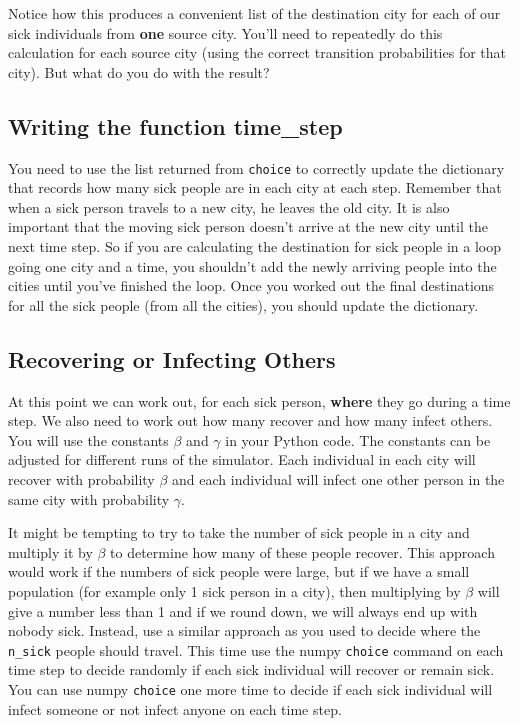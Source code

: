 \documentclass{assignment}
\begin{document}
Notice how this produces a convenient list of the destination city for each of our sick individuals from {\bf one} source city. You'll need to 
repeatedly do this calculation for each source city (using the correct transition probabilities for that city). But what do you do with the result?

\subsection*{Writing the function time\_step}

You need to use the list returned from \verb|choice| to correctly update the dictionary that records how many sick people are in each city at each step. Remember that when a sick person travels to a new city, he leaves the old city. It is also important that the moving sick person doesn't arrive at the new city until the next
time step. So if you are calculating the destination for sick people in a loop going one city and a time, you shouldn't add the newly arriving 
people into the cities until you've finished the loop. Once you worked out the final destinations for all the sick people (from all the cities), you
should update the dictionary.

\subsection*{Recovering or Infecting Others}

At this point we can work out, for each sick person, {\bf where} they go during a time step. We also need to work out how many recover
and how many infect others. You will use the constants $\beta$ and $\gamma$ in your
Python code. The constants can be adjusted for different runs of the simulator. 
Each individual in each city will recover with probability $\beta$ and each individual will infect one other person in the same city with probability $\gamma$.

It might be tempting to try to take the number of sick people in a city and multiply it by $\beta$ to determine how many of these people recover.
This approach would work if the numbers of sick people were large, but if we have a small population (for example only 1 sick person
in a city), then multiplying by $\beta$ will give a number less than 1 and if we round down, we will always end up with nobody sick. Instead, 
use a similar approach as you used to decide where the \verb|n_sick| people should travel. This time use the numpy \verb|choice| command on each time step to decide randomly if each sick individual will recover or remain sick. You can use numpy \verb|choice| one more time to decide if each sick individual will infect someone or not infect anyone on each time step.
\end{document}
